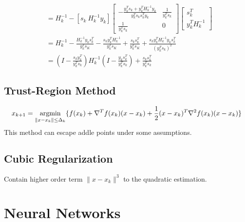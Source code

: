 \documentclass[11pt,a4paper]{article}
\newcommand{\argmin}{\operatornamewithlimits{argmin}}
\begin{document}
\begin{equation}
\begin{aligned}
        &=H_k^{-1}-[s_k\ H_k^{-1}y_k]\begin{bmatrix}
            -\frac{y_k^Ts_k+y^T_kH_k^{-1}y_k}{y_k^Ts_ks_k^Ty_k}&\frac{1}{y_k^Ts_k}\\
            \frac{1}{y_k^Ts_k}&0
        \end{bmatrix}\begin{bmatrix}
            s_k^T\\
            y_k^TH_k^{-1}
        \end{bmatrix}\\
        &=H_k^{-1}-\frac{H_k^{-1}y_ks^T_k}{y_k^Ts_K}-\frac{s_ky^T_kH_k^{-1}}{y_k^Ts_K}+\frac{s_ks_k^T}{y_k^Ts_K}+\frac{s_ky_k^TH_k^{-1}y_ks_k^T}{(y_k^Ts_k)^2}\\
        &=\left(I-\frac{s_ky_k^T}{y^T_ks_k}\right)H_k^{-1}\left(I-\frac{y_ks_k^T}{y^T_ks_k}\right)+\frac{s_ks_k^T}{y^T_ks_k}
    \end{aligned}
    \nonumber
\end{equation}
\begin{center}
\end{center}

\subsection{Trust-Region Method}
\begin{equation}
    \begin{aligned}
        x_{k+1}=\argmin_{\|x-x_k\|\leq\Delta_k}\{f(x_k)+\nabla^T f(x_k)(x-x_k)+\frac{1}{2}(x-x_k)^T \nabla^2 f(x_k) (x-x_k)\}
    \end{aligned}
    \nonumber
\end{equation}
This method can escape addle points under some assumptions.

\subsection{Cubic Regularization}
Contain higher order term $\|x-x_k\|^3$ to the quadratic estimation.

\section{Neural Networks}
\end{document}
